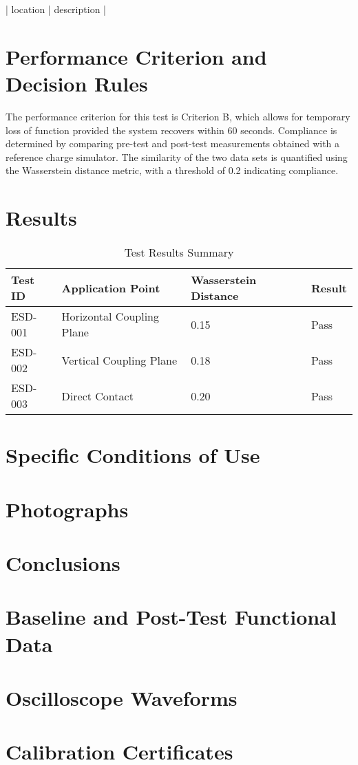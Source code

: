 \documentclass[a4paper,12pt]{article}
\begin{document}
| location | description |

\section{Performance Criterion and Decision Rules}
The performance criterion for this test is Criterion B, which allows for temporary loss of function provided the system recovers within 60 seconds. Compliance is determined by comparing pre-test and post-test measurements obtained with a reference charge simulator. The similarity of the two data sets is quantified using the Wasserstein distance metric, with a threshold of 0.2 indicating compliance.

\section{Results}
\begin{table}[h]
      \centering
      \begin{tabular}{|l|l|l|l|}
            \hline
            Test ID & Application Point & Wasserstein Distance & Result \\
            \hline
            ESD-001 & Horizontal Coupling Plane & 0.15 & Pass \\
            ESD-002 & Vertical Coupling Plane & 0.18 & Pass \\
            ESD-003 & Direct Contact & 0.20 & Pass \\ 
            \hline
      \end{tabular}
      \caption{Test Results Summary}
      \label{tab:test_results}
\end{table}


\section{Specific Conditions of Use}

\section{Photographs}

\section{Conclusions}
\newpage
\appendix
\section{Baseline and Post-Test Functional Data}\label{app:baseline}

\section{Oscilloscope Waveforms}\label{app:waveforms}

\section{Calibration Certificates}\label{app:cal}
\end{document}
